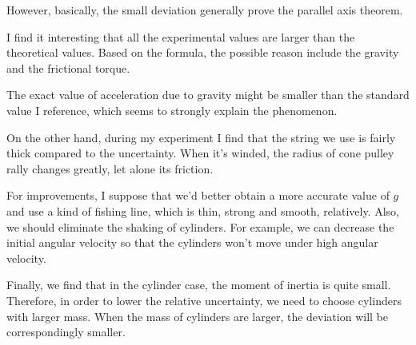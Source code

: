    However, basically, the small deviation generally prove the parallel axis theorem.

    I find it interesting that all the experimental values are larger than the theoretical values. Based on the formula, the possible reason include the gravity and the frictional torque.
    
    The exact value of acceleration due to gravity might be smaller than the standard value I reference, which seems to strongly explain the phenomenon.

    On the other hand, during my experiment I find that the string we use is fairly thick compared to the uncertainty. When it's winded, the radius of cone pulley rally changes greatly, let alone its friction.

    For improvements, I suppose that we'd better obtain a more accurate value of $g$ and use a kind of fishing line, which is thin, strong and smooth, relatively. Also, we should eliminate the shaking of cylinders. For example, we can decrease the initial angular velocity so that the cylinders won't move under high angular velocity.
    
    Finally, we find that in the cylinder case, the moment of inertia is quite small. Therefore, in order to lower the relative uncertainty, we need to choose cylinders with larger mass. When the mass of cylinders are larger, the deviation will be correspondingly smaller.
